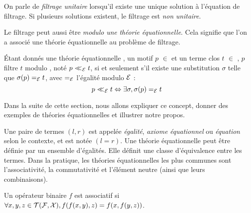 %

On parle de \emph{filtrage unitaire} lorsqu'il existe une unique solution à
l'équation de filtrage. Si plusieurs solutions existent, le filtrage est
\emph{non unitaire}.

Le filtrage peut aussi être \emph{modulo une théorie équationnelle}. Cela
signifie que l'on a associé une théorie équationnelle au problème de filtrage.

\begin{definition}
  Étant donnés une théorie équationnelle \caE, un motif $p$ $\in$ \TFX et un
  terme clos $t$ $\in$ \TF, $p$ filtre $t$ modulo \caE,
noté $p \mathrel{\mbox{$~<\hspace{-1.1em}<~$}}_{\mathcal{E}} t$, si et seulement s'il existe une substitution $\sigma$ telle que
$\sigma(p) =_{\mathcal{E}} t$, avec $=_{\mathcal{E}}$ l'égalité modulo $\mathcal{E}$ :
	$$ p \mathrel{\mbox{$~<\hspace{-1.1em}<~$}}_{\mathcal{E}} t \Leftrightarrow \exists \sigma, \sigma(p) =_{\mathcal{E}} t $$
\end{definition}

Dans la suite de cette section, nous allons expliquer ce concept, donner des
exemples de théories équationnelles et illustrer notre propos.

Une paire de termes $(l,r)$ est appelée \emph{égalité}, \emph{axiome
équationnel} ou \emph{équation} selon le contexte, et est notée $(l=r)$. Une
théorie équationnelle peut être définie par un ensemble d'égalités. Elle
définit une classe d'équivalence entre les termes.
Dans la pratique, les théories équationnelles les plus communes sont
l'associativité, la commutativité et l'élément neutre (ainsi que leurs
combinaisons).

\begin{definition}
Un opérateur binaire $f$ est associatif si $\forall x,y,z \in \mathcal{T}(\mathcal{F},\mathcal{X}), f(f(x,y),z) =
f(x,f(y,z))$.
\end{definition}

